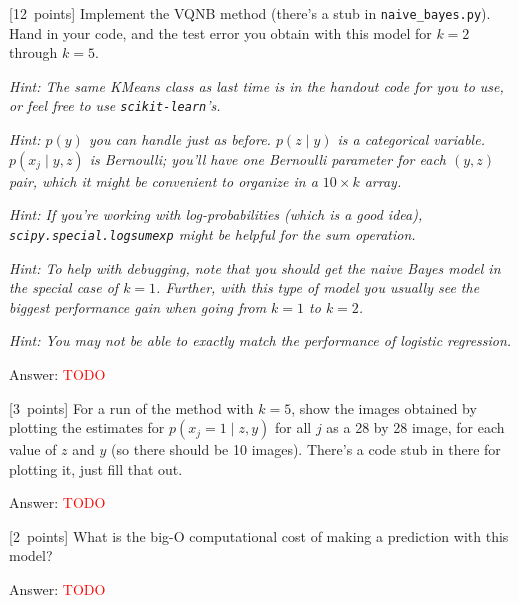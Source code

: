 \documentclass{article}
\newcommand{\ask}[1]{\textcolor{question}{#1}}
\newenvironment{answer}{\par\begingroup\color{answer}Answer: }{\endgroup}
\newcommand{\red}[1]{\textcolor{red}{#1}}
\newcommand{\pts}[1]{\textcolor{points}{[#1~points]}}
\newcommand{\hint}[1]{\textcolor{black!60!white}{\emph{Hint: #1}}}
\newcommand{\TODO}{\red{TODO}}
\begin{document}
\begin{qlist}[resume]
\item \pts{12}
    Implement the VQNB method (there's a stub in \texttt{naive\_bayes.py}).
    \ask{Hand in your code, and the test error you obtain with this model for $k=2$ through $k=5$.}

    \hint{The same KMeans class as last time is in the handout code for you to use, or feel free to use \texttt{scikit-learn}'s.}

    \hint{
        $p(y)$ you can handle just as before.
        $p(z \mid y)$ is a categorical variable.
        $p(x_j \mid y, z)$ is Bernoulli; you'll have one Bernoulli parameter for each $(y, z)$ pair, which it might be convenient to organize in a $10 \times k$ array.
    }

    \hint{If you're working with log-probabilities (which is a good idea), \texttt{scipy.special.logsumexp} might be helpful for the sum operation.}

    \hint{To help with debugging, note that you should get the naive Bayes model in the special case of $k=1$. Further, with this type of model you usually see the biggest performance gain when going from $k=1$ to $k=2$.}

    \hint{You may not be able to exactly match the performance of logistic regression.}

\begin{answer}\TODO\end{answer}


\item \pts{3}
    For a run of the method with $k=5$,
    \ask{show the images obtained by plotting the estimates for $p(x_j = 1 \mid z, y)$ for all $j$ as a 28 by 28 image, for each value of $z$ and $y$} (so there should be 10 images).
    There's a code stub in there for plotting it, just fill that out.

\begin{answer}\TODO\end{answer}

\item \pts{2} \ask{What is the big-O computational cost of making a prediction with this model?}

\begin{answer}\TODO\end{answer}


\end{qlist}


\clearpage
\end{document}
